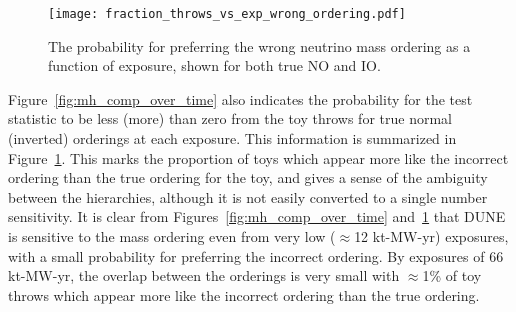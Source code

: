 \begin{figure}[htbp]
  \centering
  \texttt{[image: fraction\_throws\_vs\_exp\_wrong\_ordering.pdf]}
  \caption{The probability for preferring the wrong neutrino mass ordering as a function of exposure, shown for both true NO and IO.}
  \label{fig:mh_wrong}
\end{figure}
Figure~\ref{fig:mh_comp_over_time} also indicates the probability for the test statistic \dchisqMO to be less (more) than zero from the toy throws for true normal (inverted) orderings at each exposure. This information is summarized in Figure~\ref{fig:mh_wrong}. This marks the proportion of toys which appear more like the incorrect ordering than the true ordering for the toy, and gives a sense of the ambiguity between the hierarchies, although it is not easily converted to a single number sensitivity. It is clear from Figures~\ref{fig:mh_comp_over_time} and~\ref{fig:mh_wrong} that DUNE is sensitive to the mass ordering even from very low ($\approx$12 kt-MW-yr) exposures, with a small probability for preferring the incorrect ordering. By exposures of 66 kt-MW-yr, the overlap between the orderings is very small with $\approx$1\% of toy throws which appear more like the incorrect ordering than the true ordering.

\begin{figure*}[htbp]
  \centering
  \\
  \caption{Fraction of throws for which the DUNE sensitivity to the mass ordering exceeds 1--5$\sigma$ significance, as a function of the true value of \deltacp. Shown for NO, for a number of different exposures. The number of throws used to make each figure is also shown.}
  \label{fig:mh_nh_over_time}
\end{figure*}

